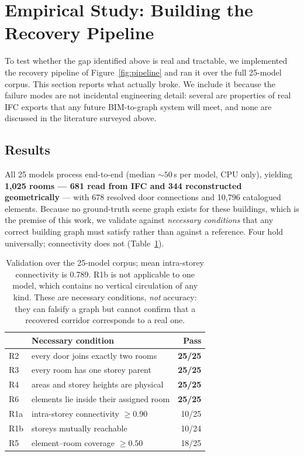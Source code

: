 \documentclass[10pt,twocolumn,letterpaper]{article}
\begin{document}
\section{Empirical Study: Building the Recovery Pipeline}
\label{sec:empirical}

To test whether the gap identified above is real and tractable, we implemented
the recovery pipeline of Figure~\ref{fig:pipeline} and ran it over the full
25-model corpus. This section reports what actually broke. We include it because
the failure modes are not incidental engineering detail: several are properties
of real IFC exports that any future BIM-to-graph system will meet, and none are
discussed in the literature surveyed above.

\subsection{Results}

All 25 models process end-to-end (median ${\sim}50$\,s per model, CPU only),
yielding \textbf{1{,}025 rooms --- 681 read from IFC and 344 reconstructed
geometrically} --- with 678 resolved door connections and 10{,}796 catalogued
elements. Because no ground-truth scene graph exists for these buildings, which
is the premise of this work, we validate against \emph{necessary conditions}
that any correct building graph must satisfy rather than against a reference.
Four hold universally; connectivity does not (Table~\ref{tab:validation}).

\begin{table}[t]
\centering
\small
\begin{tabular}{llr}
\toprule
& \textbf{Necessary condition} & \textbf{Pass} \\
\midrule
R2 & every door joins exactly two rooms      & \textbf{25/25} \\
R3 & every room has one storey parent        & \textbf{25/25} \\
R4 & areas and storey heights are physical   & \textbf{25/25} \\
R6 & elements lie inside their assigned room & \textbf{25/25} \\
\addlinespace
R1a & intra-storey connectivity $\geq0.90$   & 10/25 \\
R1b & storeys mutually reachable             & 10/24 \\
R5 & element--room coverage $\geq0.50$       & 18/25 \\
\bottomrule
\end{tabular}
\caption{Validation over the 25-model corpus; mean intra-storey connectivity is
0.789. R1b is not applicable to one model, which contains no vertical
circulation of any kind. These are necessary conditions, \emph{not} accuracy:
they can falsify a graph but cannot confirm that a recovered corridor
corresponds to a real one.}
\label{tab:validation}
\end{table}
\end{document}
